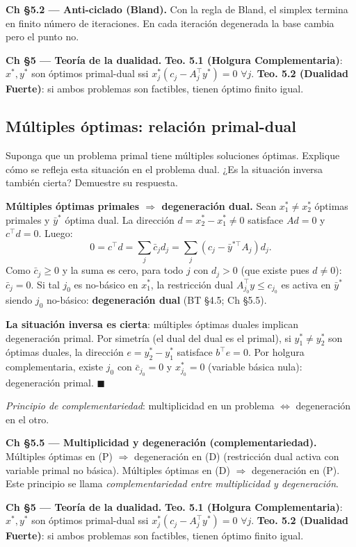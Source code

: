 \documentclass[12pt]{article}
\theoremstyle{plain}
\begin{document}
\begin{teofund}
\textbf{Ch §5.2 — Anti-ciclado (Bland).} Con la regla de Bland, el simplex termina en finito número de iteraciones. En cada iteración degenerada la base cambia pero el punto no.

\textbf{Ch §5 — Teoría de la dualidad.} \textbf{Teo. 5.1 (Holgura Complementaria)}: $x^*,y^*$ son óptimos primal-dual ssi $x^*_j(c_j-A_j^\top y^*)=0$ $\forall j$. \textbf{Teo. 5.2 (Dualidad Fuerte)}: si ambos problemas son factibles, tienen óptimo finito igual.
\end{teofund}

\bigskip

\subsection{Múltiples óptimas: relación primal-dual}

Suponga que un problema primal tiene múltiples soluciones óptimas. Explique cómo se refleja
esta situación en el problema dual. ¿Es la situación inversa también cierta? Demuestre su
respuesta.

\begin{solucion}

\textbf{Múltiples óptimas primales $\Rightarrow$ degeneración dual.} Sean $x_1^*\neq x_2^*$ óptimas primales y $\bar{y}^*$ óptima dual. La dirección $d=x_2^*-x_1^*\neq 0$ satisface $Ad=0$ y $c^\top d=0$. Luego:
\[
0 = c^\top d = \sum_j \bar{c}_j d_j = \sum_j(c_j-\bar{y}^{*\top}A_j)d_j.
\]
Como $\bar{c}_j\geq 0$ y la suma es cero, para todo $j$ con $d_j>0$ (que existe pues $d\neq 0$): $\bar{c}_j=0$. Si tal $j_0$ es no-básico en $x_1^*$, la restricción dual $A_{j_0}^\top y\leq c_{j_0}$ es activa en $\bar{y}^*$ siendo $j_0$ no-básico: \textbf{degeneración dual} (BT §4.5; Ch §5.5).

\textbf{La situación inversa es cierta}: múltiples óptimas duales implican degeneración primal. Por simetría (el dual del dual es el primal), si $y_1^*\neq y_2^*$ son óptimas duales, la dirección $e=y_2^*-y_1^*$ satisface $b^\top e=0$. Por holgura complementaria, existe $j_0$ con $\bar{c}_{j_0}=0$ y $x_{j_0}^*=0$ (variable básica nula): degeneración primal. $\blacksquare$

\textit{Principio de complementariedad}: multiplicidad en un problema $\Leftrightarrow$ degeneración en el otro.

\end{solucion}

\begin{teofund}
\textbf{Ch §5.5 — Multiplicidad y degeneración (complementariedad).} Múltiples óptimas en (P) $\Rightarrow$ degeneración en (D) (restricción dual activa con variable primal no básica). Múltiples óptimas en (D) $\Rightarrow$ degeneración en (P). Este principio se llama \emph{complementariedad entre multiplicidad y degeneración}.

\textbf{Ch §5 — Teoría de la dualidad.} \textbf{Teo. 5.1 (Holgura Complementaria)}: $x^*,y^*$ son óptimos primal-dual ssi $x^*_j(c_j-A_j^\top y^*)=0$ $\forall j$. \textbf{Teo. 5.2 (Dualidad Fuerte)}: si ambos problemas son factibles, tienen óptimo finito igual.
\end{teofund}
\end{document}
